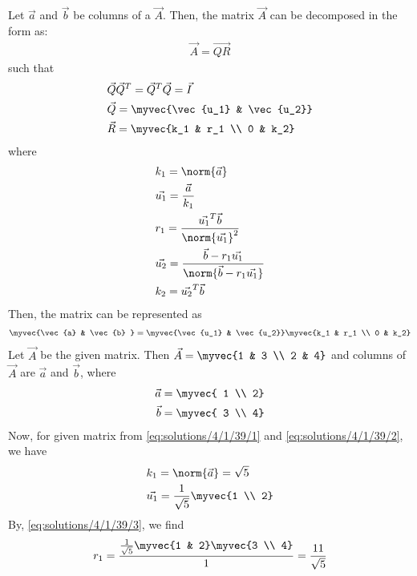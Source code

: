 Let $\vec{a}$ and $\vec{b}$ be columns of a $\vec{A}$. Then, the matrix $\vec{A}$ can be decomposed in the form as:
\begin{align}
 \vec{A} = \vec{QR} 
\end{align}
such that  
\begin{align}
	& \vec{Q}\vec{Q}^T= \vec{Q}^T\vec{Q} = \vec{I} \\ 
	& \vec{Q} = \myvec{\vec{u_1} & \vec{u_2}}  \\
	& \vec{R} = \myvec{k_1 & r_1 \\ 0 & k_2} 
\end{align}
where
\begin{align}
& k_1 = \norm{\vec{a}} \label{eq:solutions/4/1/39/1} \\
& \vec{u_1} = \frac{\vec{a}}{k_1} \label{eq:solutions/4/1/39/2} \\
& r_1 = \frac{\vec{u_1}^T\vec{b}}{\norm{\vec{u_1}}^2} \label{eq:solutions/4/1/39/3} \\
& \vec{u_2} = \frac{\vec{b}-r_1\vec{u_1}}{\norm{\vec{b}-r_1\vec{u_1}}} \label{eq:solutions/4/1/39/4} \\
& k_2 = \vec{u_2}^T\vec{b} \label{eq:solutions/4/1/39/5}
\end{align}
Then, the matrix can be represented as 
\begin{align}
	\myvec{\vec{a} & \vec{b} } = \myvec{\vec{u_1} & \vec{u_2}}\myvec{k_1 & r_1 \\ 0 & k_2} \label{eq:solutions/4/1/39/6}
\end{align}
Let $\vec{A}$ be the given matrix. Then $\vec{A} = \myvec{1 & 3 \\ 2 & 4}$ and columns of $\vec{A}$ are $\vec{a}$ and $\vec{b}$, where
\begin{align}
	\vec{a} = \myvec{ 1 \\ 2} \\
	\vec{b} = \myvec{ 3 \\ 4}
\end{align}
Now, for given matrix from \eqref{eq:solutions/4/1/39/1} and \eqref{eq:solutions/4/1/39/2}, we have
\begin{align}
&	k_1 = \norm{\vec{a}} = \sqrt{5} \\
&	\vec{u_1} = \frac{1}{\sqrt{5}}\myvec{1 \\ 2}
\end{align}
By, \eqref{eq:solutions/4/1/39/3}, we find
\begin{align}
	r_1 = \frac{\frac{1}{\sqrt{5}}\myvec{1 & 2}\myvec{3 \\ 4}}{1} =\frac{11}{\sqrt{5}}
\end{align}
